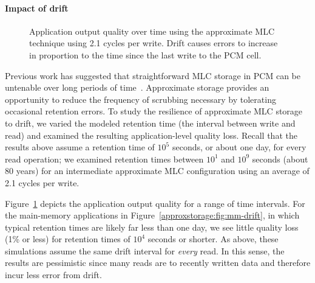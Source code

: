 \paragraph{Impact of drift}

\begin{figure}
    \centering
    \caption{
        Application output quality over time using the approximate MLC
        technique using 2.1 cycles per write.
        Drift causes errors to increase in proportion to the time
        since the last write to the PCM cell.
    }
    \label{approxstorage:fig:drift}
\end{figure}

Previous work has suggested that straightforward MLC storage in PCM can be
untenable over long periods of time~\cite{wdddmlcpcm}.
Approximate storage provides an opportunity to reduce the frequency of
scrubbing necessary by tolerating occasional retention errors.
To study the resilience of approximate MLC storage to drift,
we varied the modeled retention time (the interval between write and read) and
examined the resulting application-level quality loss.
Recall that the results
above assume a retention time of $10^5$ seconds, or about one day, for every
read operation; we examined retention times between $10^1$ and $10^9$ seconds
(about 80 years) for an intermediate approximate MLC configuration using an
average of 2.1 cycles per write.

Figure~\ref{approxstorage:fig:drift} depicts the application output quality for a range of
time intervals.
For the main-memory applications in Figure~\ref{approxstorage:fig:mm-drift}, in which typical retention times are
likely far less than one day, we see little quality loss (1\% or
less) for retention times of $10^4$ seconds or shorter.
As above, these simulations assume the same drift interval for \emph{every}
read.
In this sense, the results are pessimistic since many reads
are to recently written data and therefore incur less error from
drift.

